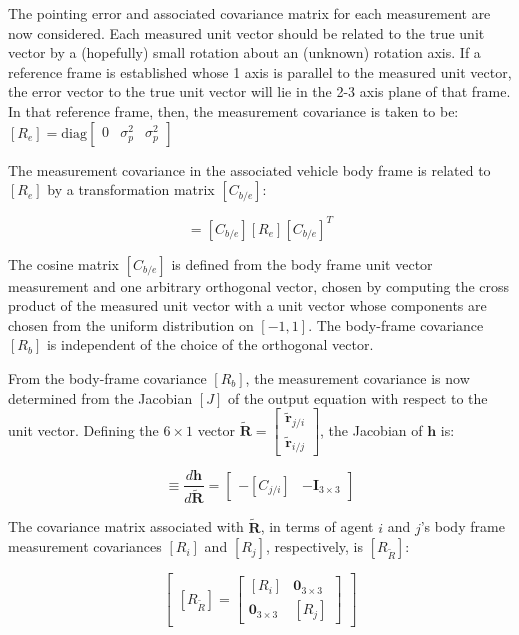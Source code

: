\documentclass{aiaa-tc}
\newcommand{\B}[1]{\textbf{#1}} %
\newcommand{\ddarg}[2]{\frac{d#1}{d#2}} %
\begin{document}
The pointing error and associated covariance matrix for each measurement are now considered. Each measured unit vector should be related to the true unit vector by a (hopefully) small rotation about an (unknown) rotation axis. If a reference frame is established whose 1 axis is parallel to the measured unit vector, the error vector to the true unit vector will lie in the 2-3 axis plane of that frame. In that reference frame, then, the measurement covariance is taken to be: $[R_e] = \mathrm{diag} \begin{bmatrix} 0 & \sigma_p^2 & \sigma_p^2
\end{bmatrix}$

The measurement covariance in the associated vehicle body frame is related to $[R_e]$ by a transformation matrix $[C_{b/e}]$:

\begin{equation}
[R_b] = [C_{b/e}][R_e][C_{b/e}]^T
\end{equation}

The cosine matrix $[C_{b/e}]$ is defined from the body frame unit vector measurement and one arbitrary orthogonal vector, chosen by computing the cross product of the measured unit vector with a unit vector whose components are chosen from the uniform distribution on $[-1,1]$. The body-frame covariance $[R_b]$ is independent of the choice of the orthogonal vector.

From the body-frame covariance $[R_b]$, the measurement covariance is now determined from the Jacobian $[J]$ of the output equation with respect to the unit vector. Defining the $6 \times 1$ vector $\tilde{\B{R}} = \begin{bmatrix}
\tilde{\B{r}}_{j/i} \\
\tilde{\B{r}}_{i/j}
\end{bmatrix}$, the Jacobian of $\B{h}$ is:

\begin{equation}
[J] \equiv \ddarg{\B{h}}{\tilde{\B{R}}} = \begin{bmatrix}
-[C_{j/i}] & -\B{I}_{3\times 3}
\end{bmatrix}
\end{equation}

The covariance matrix associated with $\tilde{\B{R}}$, in terms of agent $i$ and $j$'s body frame measurement covariances $[R_i]$ and $[R_j]$, respectively, is $[R_{\tilde{R}}]$:

\begin{equation}
\begin{bmatrix}
[R_{\tilde{R}}] = \begin{bmatrix}
[R_i] & \B{0}_{3\times 3} \\
\B{0}_{3\times 3} & [R_j]
\end{bmatrix}
\end{bmatrix}
\end{equation}
\end{document}

